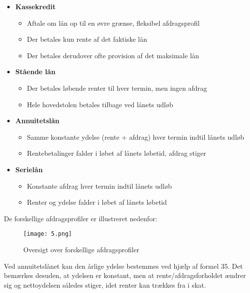 \documentclass[10pt,reqno, usenames]{article}
\begin{document}
\begin{itemize}
    \item \textbf{Kassekredit}
    \begin{itemize}
        \item Aftale om lån op til en øvre grænse, fleksibel afdragsprofil
        \item Der betales kun rente af det faktiske lån
        \item Der betales derudover ofte provision af det maksimale lån
    \end{itemize}
    
    \item \textbf{Stående lån}
    \begin{itemize}
        \item Der betales løbende renter til hver termin, men ingen afdrag
        \item Hele hovedstolen betales tilbage ved lånets udløb
    \end{itemize}

    \item \textbf{Annuitetslån}
    \begin{itemize}
        \item Samme konstante ydelse (rente + afdrag) hver termin indtil lånets udløb
        \item Rentebetalinger falder i løbet af lånets løbetid, afdrag stiger
    \end{itemize}

    \item \textbf{Serielån}
    \begin{itemize}
        \item Konstante afdrag hver termin indtil lånets udløb
        \item Renter og ydelse falder i løbet af lånets løbetid
    \end{itemize}
\end{itemize}

De forskellige afdragsprofiler er illustreret nedenfor: 

\begin{figure}[h]
     \centering
     \texttt{[image: 5.png]}
     \caption{Oversigt over forskellige afdragsprofiler}
     \label{Figur 2}
\end{figure} 

Ved annuitetslånet kan den årlige ydelse bestemmes ved hjælp af formel 35. Det bemærkes desuden, at ydelsen er konstant, men at rente/afdragsforholdet ændrer sig og nettoydelsen således stiger, idet renter kan trækkes fra i skat. 
\end{document}
